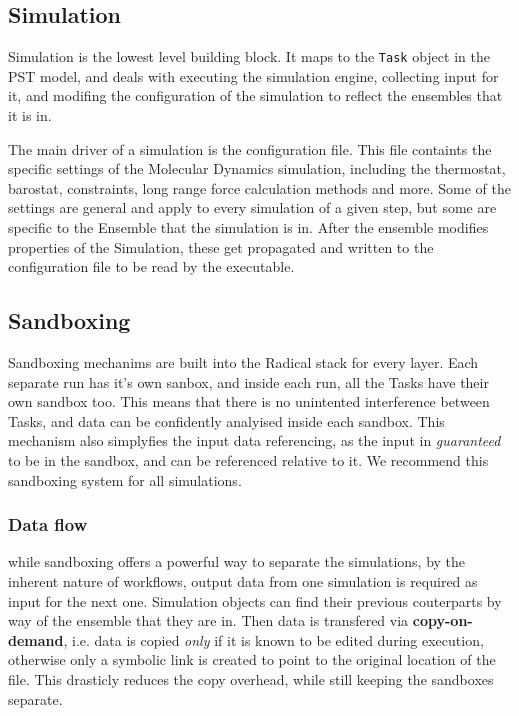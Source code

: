 \subsection{Simulation}

Simulation is the lowest level building block. It maps to the \texttt{Task}
object in the PST model, and deals with executing the simulation engine,
collecting input for it, and modifing the configuration of the simulation to
reflect the ensembles that it is in.

The main driver of a simulation is the configuration file. This file
containts the specific settings of the Molecular Dynamics simulation,
including the thermostat, barostat, constraints, long range force calculation
methods and more. Some of the settings are general and apply to every
simulation of a given step, but some are specific to the Ensemble that the
simulation is in. After the ensemble modifies properties of the Simulation,
these get propagated and written to the configuration file to be read by the
executable.

\subsection{Sandboxing}

Sandboxing mechanims are built into the Radical stack for every layer. Each
separate run has it's own sanbox, and inside each run, all the Tasks have
their own sandbox too. This means that there is no unintented interference
between Tasks, and data can be confidently analyised inside each sandbox.
This mechanism also simplyfies the input data referencing, as the input in
\emph{guaranteed} to be in the sandbox, and can be referenced relative to it.
We recommend this sandboxing system for all simulations.

\subsubsection{Data flow}

while sandboxing offers a powerful way to separate the simulations, by the
inherent nature of workflows, output data from one simulation is required as
input for the next one. Simulation objects can find their previous
couterparts by way of the ensemble that they are in. Then data is transfered
via \textbf{copy-on-demand}, i.e. data is copied \emph{only} if it is known
to be edited during execution, otherwise only a symbolic link is created to
point to the original location of the file. This drasticly reduces the copy
overhead, while still keeping the sandboxes separate.

